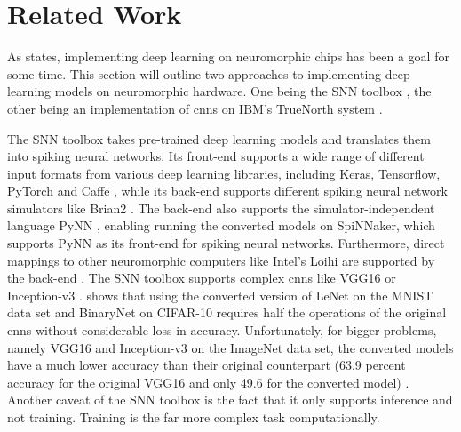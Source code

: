 \documentclass[]{article}
\begin{document}



\section{Related Work} %
\label{sec:related_work}

As \citet{gomes_2017} states, implementing deep learning on
neuromorphic chips has been a goal for some time.
This section will outline two approaches to implementing deep learning
models on neuromorphic hardware.
One being the SNN toolbox \citep{rueckauer_et_al_2017}, the other
being an implementation of \acrshort{cnn}s on IBM's TrueNorth system
\citep{esser_et_al_2016}.

The SNN toolbox takes pre-trained deep learning models and translates
them into spiking neural networks.
Its front-end supports a wide range of different input formats from
various deep learning libraries, including Keras, Tensorflow, PyTorch
and Caffe \citep{jia_et_al_2014}, while its back-end supports
different spiking neural network simulators like Brian2
\citep{stimberg_et_al_2019}.
The back-end also supports the simulator-independent language PyNN
\citep{davison_et_al_2009}, enabling running the converted models
on SpiNNaker, which supports PyNN as its front-end for spiking neural
networks.
Furthermore, direct mappings to other neuromorphic
computers like Intel's Loihi \citep{davies_et_al_2018} are supported
by the back-end \citep{snn_toolbox_2020}.
The SNN toolbox supports complex \acrshort{cnn}s like VGG16 or Inception-v3
\citep{szegedy_et_al_2015, rueckauer_et_al_2017}.
\citet{rueckauer_et_al_2017} shows that using the converted version of
LeNet \citep{lecun_et_al_1989} on the MNIST data set
\citep{lecun_et_al_2020} and BinaryNet \citep{courbariaux_et_al_2016}
on CIFAR-10 \citep{krizhevsky_2009} requires half the
operations of the original \acrshort{cnn}s without considerable loss in
accuracy.
Unfortunately, for bigger problems, namely VGG16 and Inception-v3 on
the ImageNet data set, the converted models have a much lower accuracy
than their original counterpart (63.9 percent accuracy for the
original VGG16 and only 49.6 for the converted model)
\citep{rueckauer_et_al_2017}.
Another caveat of the SNN toolbox is the fact that it only supports
inference and not training.
Training is the far more complex task computationally.
\end{document}

